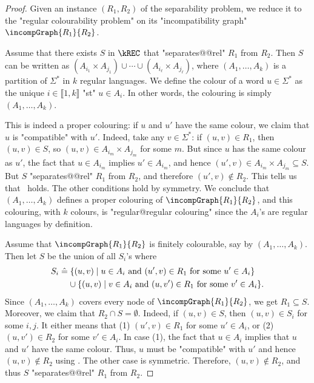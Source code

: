 \begin{proof}

    \AP Given an instance $(R_1,R_2)$ of the separability problem, we
    reduce it to the "regular colourability problem" on its "incompatibility graph" $\incompGraph{R_1}{R_2}$.

   Assume that there exists $S$ in $\kREC$ that "separates@@rel" $R_1$ from $R_2$.
    Then $S$ can be written as $(A_{i_1}\times A_{j_1}) \cup \cdots \cup (A_{i_\ell}\times A_{j_\ell})$, 
    where $(A_1,\hdots,A_k)$ is a partition of $\Sigma^*$ in $k$ regular languages.
   We define the colour of a word $u \in \Sigma^*$ as the unique $i \in \lBrack 1,k \rBrack$
    "st" $u \in A_i$. In other words, the colouring is simply $(A_1,\hdots,A_k)$. 

    This is indeed a proper colouring: if $u$ and $u'$ have the same colour,
    we claim that $u$ is "compatible" with $u'$. Indeed, take any $v \in \Sigma^*$: if $(u,v) \in R_1$,
    then $(u,v) \in S$, so $(u,v) \in A_{i_m}\times A_{j_m}$ for some $m$. But since $u$ has the same colour 
    as $u'$, the fact that $u \in A_{i_m}$ implies $u' \in A_{i_m}$, and hence 
    $(u',v) \in A_{i_m}\times A_{j_m}\subseteq S$.
    But $S$ "separates@@rel" $R_1$ from $R_2$, and therefore $(u',v) \not\in R_2$. This tells us that \compL\ holds. 
    The other conditions hold by symmetry.
    We conclude that $(A_1,\hdots,A_k)$ defines
    a proper colouring of $\incompGraph{R_1}{R_2}$, and this colouring, with $k$ colours, is 
    "regular@regular colouring" since the $A_i$'s are regular languages by definition.

     Assume that $\incompGraph{R_1}{R_2}$ is finitely colourable, say by
    $(A_1,\hdots,A_k)$. Then let $S$ be the union of all $S_i$'s where
    \begin{align*}
        S_{i} & \defeq \{(u,v) \mid u \in A_i \text{ and } (u',v) \in R_1 \text{ for some } u' \in A_i \}\\
&         \hphantom{\defeq~}\cup \{(u,v) \mid v \in A_i \text{ and } (u,v') \in R_1 \text{ for some } v' \in A_i \}.  
    \end{align*}
    Since $(A_1,\hdots,A_k)$ covers every node of $\incompGraph{R_1}{R_2}$, we get $R_1 \subseteq S$.
    Moreover, we claim that $R_2 \cap S = \emptyset$. Indeed, if $(u,v) \in S$,
    then $(u,v) \in S_{i}$ for some $i,j$. It either means that (1)
    $(u',v) \in R_1$ for some $u' \in A_i$, or (2) $(u,v') \in R_2$
    for some $v' \in A_i$. In case (1), the fact that $u \in A_i$ implies that $u$ and $u'$
    have the same colour. Thus, $u$ must be "compatible" with $u'$ and hence
    $(u,v) \not\in R_2$ using \compLpr. The other case is symmetric.
    Therefore, $(u,v) \not\in R_2$, and thus $S$ "separates@@rel" $R_1$ from $R_2$.


\end{proof}
